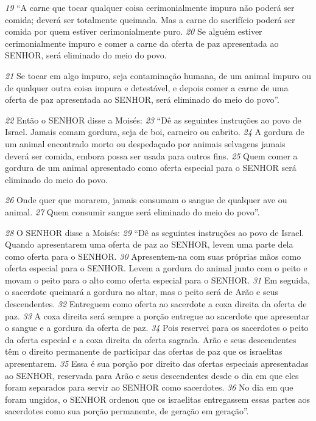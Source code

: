 \smallskip
\textit{\tiny 19}
“A carne que tocar qualquer coisa cerimonialmente impura não poderá ser
comida; deverá ser totalmente queimada. Mas a carne do sacrifício poderá ser
comida por quem estiver cerimonialmente puro. 
\textit{\tiny 20}
Se alguém estiver
cerimonialmente impuro e comer a carne da oferta de paz apresentada ao SENHOR,
será eliminado do meio do povo. 

\smallskip
\textit{\tiny 21}
Se tocar em algo impuro, seja contaminação
humana, de um animal impuro ou de qualquer outra coisa impura e detestável, e
depois comer a carne de uma oferta de paz apresentada ao SENHOR, será
eliminado do meio do povo”.

\smallskip
\textit{\tiny 22}
Então o SENHOR disse a Moisés: 
\textit{\tiny 23}
“Dê as seguintes instruções ao povo de Israel.
Jamais comam gordura, seja de boi, carneiro ou cabrito. 
\textit{\tiny 24}
A gordura de um
animal encontrado morto ou despedaçado por animais selvagens jamais deverá
ser comida, embora possa ser usada para outros fins. 
\textit{\tiny 25}
Quem comer a gordura de
um animal apresentado como oferta especial para o SENHOR será eliminado do
meio do povo. 

\smallskip
\textit{\tiny 26}
Onde quer que morarem, jamais consumam o sangue de
qualquer ave ou animal. 
\textit{\tiny 27}
Quem consumir sangue será eliminado do meio do
povo”.

\smallskip
\textit{\tiny 28}
O SENHOR disse a Moisés: 
\textit{\tiny 29}
“Dê as seguintes instruções ao povo de Israel.
Quando apresentarem uma oferta de paz ao SENHOR, levem uma parte dela como
oferta para o SENHOR. 
\textit{\tiny 30}
Apresentem-na com suas próprias mãos como oferta
especial para o SENHOR. Levem a gordura do animal junto com o peito e movam o
peito para o alto como oferta especial para o SENHOR. 
\textit{\tiny 31}
Em seguida, o sacerdote
queimará a gordura no altar, mas o peito será de Arão e seus descendentes.
\textit{\tiny 32}
Entreguem como oferta ao sacerdote a coxa direita da oferta de paz. 
\textit{\tiny 33}
A coxa
direita será sempre a porção entregue ao sacerdote que apresentar o sangue e a
gordura da oferta de paz. 
\textit{\tiny 34}
Pois reservei para os sacerdotes o peito da oferta
especial e a coxa direita da oferta sagrada. Arão e seus descendentes têm o direito
permanente de participar das ofertas de paz que os israelitas apresentarem.
\textit{\tiny 35}
Essa é sua porção por direito das ofertas especiais apresentadas ao SENHOR,
reservada para Arão e seus descendentes desde o dia em que eles foram
separados para servir ao SENHOR como sacerdotes. 
\textit{\tiny 36}
No dia em que foram
ungidos, o SENHOR ordenou que os israelitas entregassem essas partes aos
sacerdotes como sua porção permanente, de geração em geração”.
   
